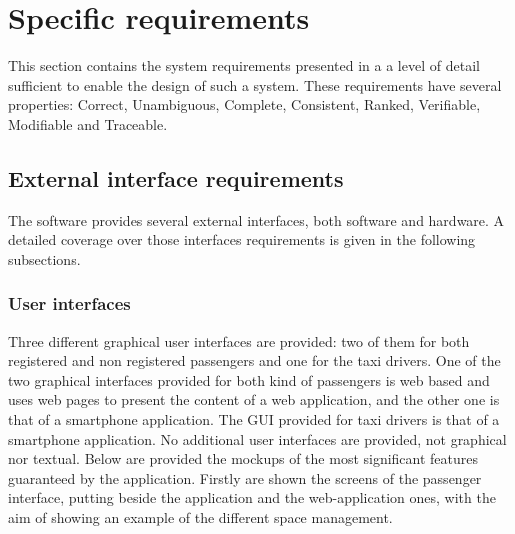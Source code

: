 \section{Specific requirements}
This section contains the system requirements presented in a a level of detail sufficient to enable the design of such a system.
These requirements have several properties: Correct, Unambiguous, Complete, Consistent, Ranked, Verifiable, Modifiable and Traceable.
%
\subsection{External interface requirements}
The software \myTaxiService{} provides several external interfaces, both software and hardware.
A detailed coverage over those interfaces requirements is given in the following subsections.
%
\subsubsection{User interfaces}
Three different graphical user interfaces are provided: two of them for both registered and non registered passengers and one for the taxi drivers.
One of the two graphical interfaces provided for both kind of passengers is web based and uses web pages to present the content of a web application, and the other one is that of a smartphone application.
The GUI provided for taxi drivers is that of a smartphone application.
No additional user interfaces are provided, not graphical nor textual.
Below are provided the mockups of the  most significant features guaranteed by the application.
Firstly are shown the screens of the passenger interface, putting beside the application and the web-application ones, with the aim of showing an example of the different space management.
%
\newpage
{}
\begin{itemize}
\end{itemize}
